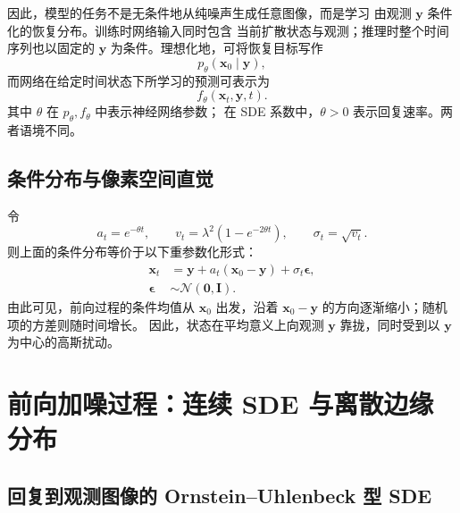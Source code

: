 \documentclass[UTF8,a4paper,12pt]{ctexart}
\begin{document}
因此，模型的任务不是无条件地从纯噪声生成任意图像，而是学习
由观测 \(\bm{y}\) 条件化的恢复分布。训练时网络输入同时包含
当前扩散状态与观测；推理时整个时间序列也以固定的 \(\bm{y}\)
为条件。理想化地，可将恢复目标写作
\[
  p_\theta(\bm{x}_0\mid\bm{y}),
\]
而网络在给定时间状态下所学习的预测可表示为
\[
  f_\theta(\bm{x}_t,\bm{y},t).
\]
其中 \(\theta\) 在 \(p_\theta,f_\theta\) 中表示神经网络参数；
在 SDE 系数中，\(\theta>0\) 表示回复速率。两者语境不同。

\subsection{条件分布与像素空间直觉}

令
\[
  a_t=e^{-\theta t},\qquad
  v_t=\lambda^2\left(1-e^{-2\theta t}\right),\qquad
  \sigma_t=\sqrt{v_t}.
\]
则上面的条件分布等价于以下重参数化形式：
\begin{align}
  \bm{x}_t
  &=\bm{y}+a_t(\bm{x}_0-\bm{y})+\sigma_t\bm{\epsilon},
  \label{eq:reparam}
  \\
  \bm{\epsilon}&\sim\mathcal{N}(\bm{0},\bm{I}).
\end{align}
由此可见，前向过程的条件均值从 \(\bm{x}_0\) 出发，沿着
\(\bm{x}_0-\bm{y}\) 的方向逐渐缩小；随机项的方差则随时间增长。
因此，状态在平均意义上向观测 \(\bm{y}\) 靠拢，同时受到以
\(\bm{y}\) 为中心的高斯扰动。

\section{前向加噪过程：连续 SDE 与离散边缘分布}

\subsection{回复到观测图像的 Ornstein--Uhlenbeck 型 SDE}
\end{document}
